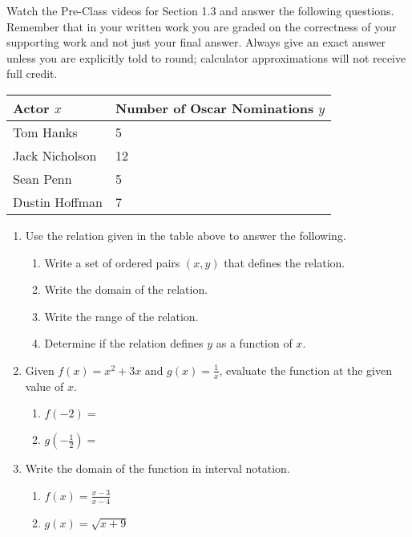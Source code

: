 


\noindent Watch the Pre-Class videos for Section 1.3 and answer the following questions. Remember that in your written work you are graded on the correctness of your supporting work and not just your final answer. Always give an exact answer unless you are explicitly told to round; calculator approximations will not receive full credit.

\begin{table}[h]
\begin{tabular}{|l|l|}
\hline
\textbf{Actor $x$} & \textbf{Number of Oscar Nominations $y$} \\ \hline
Tom Hanks          & 5                                        \\ \hline
Jack Nicholson     & 12                                       \\ \hline
Sean Penn          & 5                                        \\ \hline
Dustin Hoffman     & 7                                        \\ \hline
\end{tabular}
\end{table}



\begin{enumerate}
\item Use the relation given in the table above to answer the following.


\begin{enumerate}
\item Write a set of ordered pairs $(x,y)$ that defines the relation.\vfill
\item Write the domain of the relation.\vfill
\item Write the range of the relation.\vfill
\item Determine if the relation defines $y$ as a function of $x$.
\end{enumerate}
\vfill

\newpage
\item Given $f(x)=x^2+3x$ and $\displaystyle g(x)=\frac{1}{x}$, evaluate the function at the given value of $x$.
\begin{enumerate}
\item $f(-2)=$ \\[.5in]
\item $\displaystyle g(-\frac{1}{2})=$\\[.5in]
\end{enumerate}




\item Write the domain of the function in interval notation.
\begin{enumerate}
\item $\displaystyle f(x)=\frac{x-3}{x-4}$\vfill
\item $g(x)=\sqrt{x+9}$
\end{enumerate}
\vfill




\end{enumerate}



